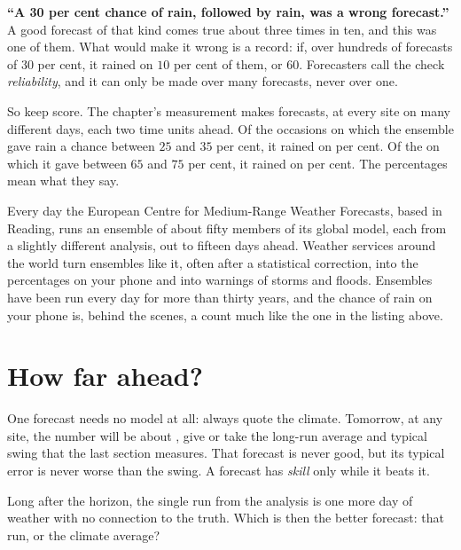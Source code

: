 \begin{trapbox}
\textbf{\enquote{A 30 per cent chance of rain, followed by rain, was a wrong
forecast.}} A good forecast of that kind comes true about three times in
ten, and this was one of them. What would make it wrong is a record: if,
over hundreds of forecasts of $30$ per cent, it rained on $10$ per cent of
them, or $60$. Forecasters call the check \emph{reliability}, and it can only
be made over many forecasts, never over one.
\end{trapbox}

\noindent
So keep score. The chapter's measurement makes 
forecasts, at every site on many different days, each two time units ahead.
Of the  occasions on which the ensemble gave rain a chance
between $25$ and $35$ per cent, it rained on  per cent. Of
the  on which it gave between $65$ and $75$ per cent, it
rained on  per cent. The percentages mean what they
say.

\begin{worldbox}
Every day the European Centre for Medium-Range Weather Forecasts, based in
Reading, runs an ensemble of about fifty members of its global model, each
from a slightly different analysis, out to fifteen days ahead. Weather
services around the world turn ensembles like it, often after a statistical
correction, into the percentages on your phone and into warnings of storms
and floods. Ensembles have been run every day for more than thirty years,
and the chance of rain on your phone is, behind the scenes, a count much
like the one in the listing above.
\end{worldbox}

\section{How far ahead?}
\label{sec:ch14-horizon}

\noindent
One forecast needs no model at all: always quote the climate. Tomorrow, at
any site, the number will be about , give or take
 \dash{} the long-run average and typical swing that the
last section measures. That forecast is never good, but its typical error is
never worse than the swing. A forecast has \emph{skill} only while it beats
it.

\begin{think}
Long after the horizon, the single run from the analysis is one more day of
weather with no connection to the truth. Which is then the better forecast:
that run, or the climate average?
\end{think}

